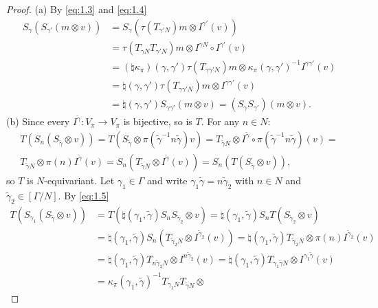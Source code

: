\documentclass[11pt]{amsart}
\theoremstyle{definition}
\begin{document}
\begin{proof}
(a) By \eqref{eq:1.3} and \eqref{eq:1.4}
\begin{align*}
S_\gamma (S_{\gamma'} (m \otimes v)) & = S_\gamma (\tau(T_{\gamma' N}) m \otimes
I^{\gamma'}(v)) \\
& = \tau(T_{\gamma N} T_{\gamma' N}) m \otimes I^{\gamma N} \circ I^{\gamma'}(v) \\
& = (\natural \kappa_\pi) (\gamma,\gamma') \tau(T_{\gamma \gamma' N}) m \otimes
\kappa_\pi (\gamma,\gamma')^{-1} I^{\gamma \gamma'}(v) \\
& = \natural (\gamma,\gamma') \tau (T_{\gamma \gamma' N}) m \otimes I^{\gamma \gamma'}(v) \\
& = \natural (\gamma,\gamma') S_{\gamma \gamma'} (m \otimes v) = 
(S_\gamma S_{\gamma'})(m \otimes v) .
\end{align*}
(b) Since every $I^{\tilde \gamma} : V_\pi \to V_\pi$ is bijective, so is $T$. 
For any $n \in N$:
\begin{multline}\label{eq:1.5}
T (S_n (S_{\tilde \gamma} \otimes v)) = T (S_{\tilde \gamma} \otimes \pi ({\tilde \gamma}^{-1}
n \tilde \gamma ) v)  
= T_{\tilde \gamma N} \otimes I^{\tilde \gamma} \circ \pi ({\tilde \gamma}^{-1} n 
\tilde \gamma ) (v) = \\
T_{\tilde \gamma N} \otimes \pi(n) I^{\tilde \gamma} (v) 
= S_n (T_{\tilde \gamma N} \otimes I^{\tilde \gamma} (v)) = 
S_n (T (S_{\tilde \gamma} \otimes v)) ,
\end{multline}
so $T$ is $N$-equivariant.
Let $\gamma_1 \in \Gamma$ and write $\gamma_1 \tilde \gamma = n {\tilde \gamma}_2$ with
$n \in N$ and ${\tilde \gamma}_2 \in [\Gamma / N ]$. By \eqref{eq:1.5}
\begin{align*}
T( S_{\gamma_1} (S_{\tilde \gamma} \otimes v)) & = T (\natural (\gamma_1, \tilde{\gamma})
S_n S_{{\tilde \gamma}_2} \otimes v) = \natural (\gamma_1, \tilde{\gamma}) S_n 
T (S_{{\tilde \gamma}_2} \otimes v) \\
& = \natural (\gamma_1, \tilde{\gamma}) S_n (T_{{\tilde \gamma}_2 N} \otimes 
I^{{\tilde \gamma}_2}(v)) = \natural (\gamma_1, \tilde{\gamma}) T_{{\tilde \gamma}_2 N} 
\otimes \pi (n) I^{{\tilde \gamma}_2}(v) \\
& = \natural (\gamma_1, \tilde{\gamma}) T_{n {\tilde \gamma}_2 N} 
\otimes I^{n {\tilde \gamma}_2}(v) = \natural (\gamma_1, \tilde{\gamma}) 
T_{\gamma_1 \tilde{\gamma} N} \otimes I^{\gamma_1 \tilde{\gamma}}(v) \\
& = \kappa_\pi (\gamma_1, \tilde{\gamma})^{-1} T_{\gamma_1 N} T_{\tilde{\gamma} N} \otimes 

\end{align*}
\end{proof}
\end{document}
